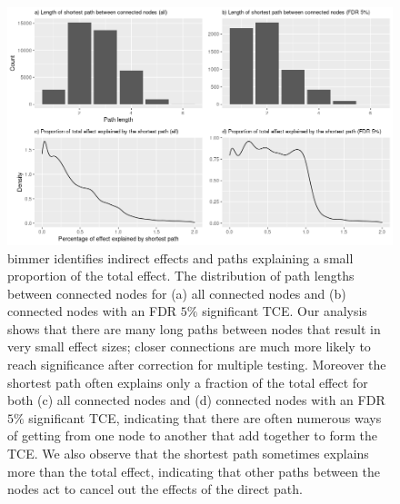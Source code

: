 \documentclass{article}
\begin{document}
\begin{figure}\label{figure6}
\includegraphics[width=\textwidth]{figures/figure6.png}
\caption{bimmer identifies indirect effects and paths explaining a small proportion of the total effect.
The distribution of path lengths between connected nodes for (a) all connected nodes and (b) connected
nodes with an FDR $5\%$ significant TCE. Our analysis shows that there are many long paths between
nodes that result in very small effect sizes; closer connections are much more likely to reach
significance after correction for multiple testing. Moreover the shortest path often explains only
a fraction of the total effect for both (c) all connected nodes and (d) connected
nodes with an FDR $5\%$ significant TCE, indicating that there are often numerous ways of
getting from one node to another that add together to form the TCE. We also observe that the shortest
path sometimes explains more than the total effect, indicating that other paths between the nodes
act to cancel out the effects of the direct path. }
\end{figure}
\end{document}
